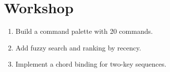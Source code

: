 \section*{Workshop}

\begin{enumerate}[leftmargin=*]
  \item Build a command palette with 20 commands.
  \item Add fuzzy search and ranking by recency.
  \item Implement a chord binding for two-key sequences.
\end{enumerate}
